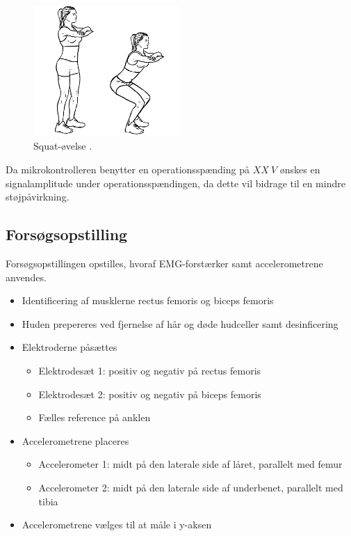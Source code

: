 \begin{figure}[H]
\centering
\includegraphics[width=0.5\textwidth]{figures/squat.png}
\caption{Squat-øvelse \citep{squat2015}.}
\label{fig:squat}
\end{figure}


Da mikrokontrolleren benytter en operationsspænding på $XX~V$ ønskes en signalamplitude under operationsspændingen, da dette vil bidrage til en mindre støjpåvirkning. 



\subsection{Forsøgsopstilling}
Forsøgsopstillingen opstilles, hvoraf EMG-forstærker samt accelerometrene anvendes. 

\begin{itemize}
\item Identificering af musklerne rectus femoris og biceps femoris 
\item Huden prepereres ved fjernelse af hår og døde hudceller samt desinficering 
\item Elektroderne påsættes
	\begin{itemize}
	\item Elektrodesæt 1: positiv og negativ på rectus femoris
	\item Elektrodesæt 2: positiv og negativ på biceps femoris
	\item Fælles reference på anklen
	\end{itemize} 
\item Accelerometrene placeres 
	\begin{itemize}
	\item Accelerometer 1: midt på den laterale side af låret, parallelt med femur
	\item Accelerometer 2: midt på den laterale side af underbenet, parallelt med tibia 
	\end{itemize}
\item Accelerometrene vælges til at måle i y-aksen
\end{itemize}

